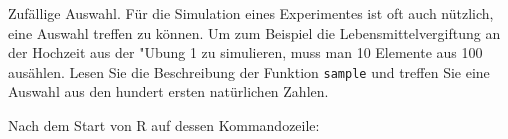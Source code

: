 Zufällige Auswahl. Für die Simulation eines Experimentes ist oft
auch nützlich, eine Auswahl treffen zu können. Um zum Beispiel die
Lebensmittelvergiftung an der Hochzeit aus der "Ubung 1 zu simulieren,
muss man 10 Elemente aus 100 ausählen. Lesen Sie die Beschreibung
der Funktion {\tt sample} und treffen Sie eine Auswahl aus den hundert
ersten natürlichen Zahlen.

\begin{loesung}
Nach dem Start von R auf dessen Kommandozeile:
\end{loesung}


